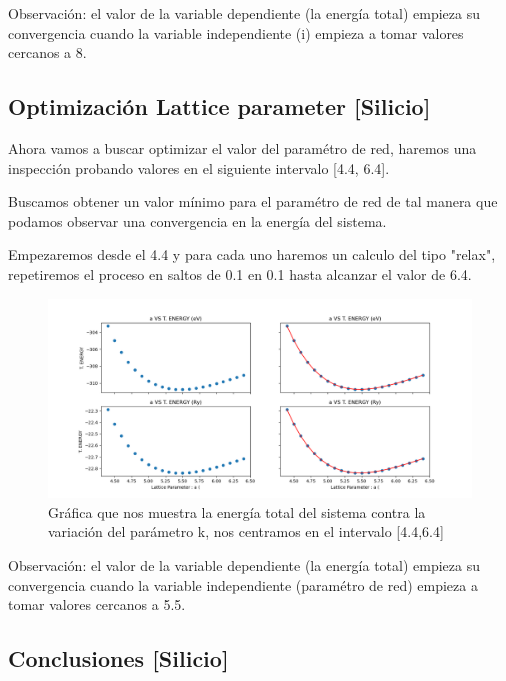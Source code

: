 Observación: el valor de la variable dependiente (la energía total) empieza su convergencia cuando 
la variable independiente (i) empieza a tomar valores cercanos a 8.


\subsection{Optimización Lattice parameter [Silicio] }

Ahora vamos a buscar optimizar el valor del paramétro de red, haremos una inspección probando valores
en el siguiente intervalo [4.4, 6.4].

\vspace{0.5cm}

Buscamos obtener un valor mínimo para el paramétro de red de tal manera que podamos observar una convergencia 
en la energía del sistema.

\vspace{0.5cm}

Empezaremos desde el 4.4 y para cada uno haremos un calculo del tipo "relax", repetiremos el proceso
en saltos de 0.1 en 0.1 hasta alcanzar el valor de 6.4.

\begin{figure}[H]
    \centering
    \includegraphics[scale=0.52]{images/lattice_parameter_vs_T_energy.png}
    \caption{Gráfica que nos muestra la energía total del sistema contra la variación del parámetro k, nos centramos en el intervalo [4.4,6.4]}
\end{figure}

Observación: el valor de la variable dependiente (la energía total) empieza su convergencia cuando 
la variable independiente (paramétro de red) empieza a tomar valores cercanos a 5.5.

\newpage

\subsection{Conclusiones [Silicio]}

